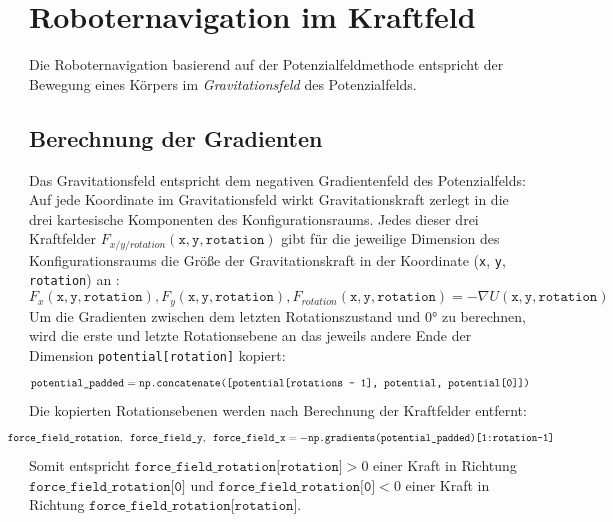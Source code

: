 \chapter{Roboternavigation im Kraftfeld}

Die Roboternavigation basierend auf der Potenzialfeldmethode entspricht der Bewegung eines Körpers im \textit{Gravitationsfeld} des Potenzialfelds.

\section{Berechnung der Gradienten}

Das Gravitationsfeld entspricht dem negativen Gradientenfeld des Potenzialfelds: Auf jede Koordinate im Gravitationsfeld wirkt Gravitationskraft zerlegt in die drei kartesische Komponenten des Konfigurationsraums. Jedes dieser drei Kraftfelder $F_{x/y/rotation}(\texttt{x}, \texttt{y}, \texttt{rotation})$ gibt für die jeweilige Dimension des Konfigurationsraums die Größe der Gravitationskraft in der Koordinate (\texttt{x}, \texttt{y}, \texttt{rotation}) an \cite{khatib.1985}:
\begin{equation*}
 F_{x}(\texttt{x}, \texttt{y}, \texttt{rotation}), F_{y}(\texttt{x}, \texttt{y}, \texttt{rotation}), F_{rotation}(\texttt{x}, \texttt{y}, \texttt{rotation}) = -\nabla U(\texttt{x}, \texttt{y}, \texttt{rotation})
\end{equation*}
Um die Gradienten zwischen dem letzten Rotationszustand und $0$° zu berechnen, wird die erste und letzte Rotationsebene an das jeweils andere Ende der Dimension \texttt{potential[rotation]} kopiert:
\begin{equation*}
\hspace*{-0.0075\linewidth}
\resizebox{1.05\linewidth}{!}{
$
	\texttt{potential\_padded} = \texttt{np.concatenate([potential[rotations - 1], potential, potential[0]])}
$
}
\hspace*{-0.0075\linewidth}
\end{equation*}
Die kopierten Rotationsebenen werden nach Berechnung der Kraftfelder entfernt:
\begin{equation*}
\hspace*{-0.075\linewidth}
\resizebox{1.15\linewidth}{!}{
$
\texttt{force\_field\_rotation}, \texttt{ force\_field\_y}, \texttt{ force\_field\_x} = -\texttt{np.gradients(potential\_padded)[1:rotation-1]}
$
}
\hspace*{-0.075\linewidth}
\end{equation*}
Somit entspricht $ \texttt{force\_field\_rotation[rotation]} > 0 $ einer Kraft in Richtung $\texttt{force\_field\_rotation[0]}$ und $ \texttt{force\_field\_rotation[0]} < 0 $ einer Kraft in Richtung $\texttt{force\_field\_rotation[rotation]}$.
